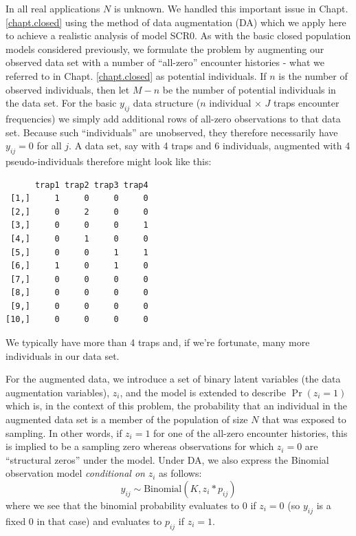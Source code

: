 In all real applications $N$ is unknown.
 We handled this
important issue in Chapt. \ref{chapt.closed} using the method of data augmentation
(DA) which we apply here to achieve a realistic analysis of model SCR0. As
with the basic closed population models considered previously, we
formulate the problem  by augmenting our observed data set with a
number of ``all-zero'' encounter histories - what we referred to in
Chapt. \ref{chapt.closed} as potential individuals. If $n$ is the number of observed
individuals, then let $M-n$ be the number of potential individuals in
the data set. For the basic $y_{ij}$ data structure ($n$ individual $\times$
$J$ traps encounter frequencies) we simply add additional rows of all-zero
observations to that data set. Because such
``individuals'' are unobserved, they  therefore necessarily have
$y_{ij}=0$ for all $j$.  A data set, say with 4 traps and 6 individuals,
augmented with 4 pseudo-individuals therefore might look like this:
{\small
\begin{verbatim}
      trap1 trap2 trap3 trap4
 [1,]     1     0     0     0
 [2,]     0     2     0     0
 [3,]     0     0     0     1
 [4,]     0     1     0     0
 [5,]     0     0     1     1
 [6,]     1     0     1     0
 [7,]     0     0     0     0
 [8,]     0     0     0     0
 [9,]     0     0     0     0
[10,]     0     0     0     0
\end{verbatim}
}
We typically have more than 4 traps and, if we're fortunate, many more
individuals in our data set.

For the augmented data, we introduce a set of binary latent variables
(the data augmentation variables), $z_{i}$, and the model is extended
to describe $\Pr(z_{i} = 1)$ which is, in the context of this problem,
the probability that an individual in the augmented data set is a
member of the population of size $N$  that was exposed to sampling. In other words, if $z_{i}=1$
for one of the all-zero encounter histories, this is implied to be
a sampling zero whereas observations for which $z_{i}=0$ are
``structural zeros'' under the model.  Under DA, we also express the
Binomial observation model {\it conditional on} $z_{i}$ as follows:
\[
	y_{ij} \sim \mbox{Binomial}(K, z_{i}*p_{ij})
\]
where we see that the binomial probability evaluates to 0 if $z_{i}=0$
(so $y_{ij}$ is a fixed 0 in that case)
and evaluates to $p_{ij}$ if $z_{i} = 1$.

